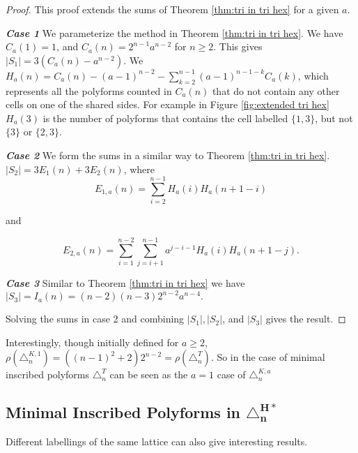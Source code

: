 \documentclass[12pt]{article}
\theoremstyle{plain}
\theoremstyle{definition}
\theoremstyle{remark}
\theoremstyle{definition}
\begin{document}
\begin{proof}
    This proof extends the sums of Theorem \ref{thm:tri in tri hex} for a given $a$.

    \textbf{\textit{Case 1}} We parameterize the method in Theorem \ref{thm:tri in tri hex}. We have $C_a(1)=1$, and $C_a(n)=2^{n-1}a^{n-2}$ for $n \geq 2$. This gives $|S_1|=3(C_a(n)-a^{n-2})$. We  $H_a(n) = C_a(n) - (a-1)^{n-2} - \sum_{k=2}^{n-1}(a-1)^{n-1-k}C_a(k)$, which represents all the polyforms counted in $C_a(n)$ that do not contain any other cells on one of the shared sides. For example in Figure \ref{fig:extended tri hex} $H_a(3)$ is the number of polyforms that contains the cell labelled $\{1,3\}$, but not $\{3\}$ or $\{2,3\}$. 

    \textbf{\textit{Case 2}} We form the sums in a similar way to Theorem \ref{thm:tri in tri hex}. $|S_2| = 3E_1(n) + 3E_2(n)$, where
    $$E_{1,a}(n) = \sum_{i=2}^{n-1}H_a(i)H_a(n+1-i)$$

    and
    
    $$E_{2,a}(n) = \sum_{i=1}^{n-2}\sum_{j=i+1}^{n-1}a^{j-i-1}H_a(i)H_a(n+1-j).$$

    \textbf{\textit{Case 3}} Similar to Theorem \ref{thm:tri in tri hex} we have $|S_3| = I_a(n) = (n-2)(n-3)2^{n-2}a^{n-4}.$ 

    Solving the sums in case 2 and combining $|S_1|, |S_2|$, and $|S_3|$ gives the result.
\end{proof}

Interestingly, though initially defined for $a \geq 2$, $\rho(\triangle^{K,1}_n) =  ((n-1)^2  + 2)2^{n-2} = \rho(\triangle^{T}_n)$. So in the case of minimal inscribed polyforms $\triangle^{T}_n$ can be seen as the $a=1$ case of $\triangle^{K,a}_n$

\subsection{Minimal Inscribed Polyforms in \texorpdfstring{$\mathbf{\triangle^{H*}_n}$}{H*n}}

Different labellings of the same lattice can also give interesting results. 
\end{document}
